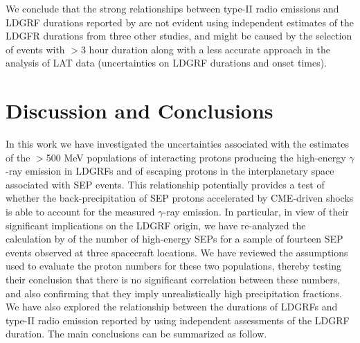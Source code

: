 \documentclass{aastex61}
\begin{document}
We conclude that 
the strong relationships between type-II radio emissions and LDGRF durations reported by \citet{ref:GOPALSWAMY2018} are not evident using independent estimates of the LDGFR durations from three other studies, and might be caused by the selection of events with $>$3 hour duration along with a less accurate approach in the analysis of LAT data (uncertainties on LDGRF durations and onset times).



%
%
%
%
\section{Discussion and Conclusions}\label{Conclusions}
In this work we have investigated the uncertainties associated with 
the estimates of
the $>$500 MeV populations of interacting protons producing the high-energy $\gamma$-ray emission in LDGRFs and of escaping protons in the interplanetary space associated with SEP events.
This relationship potentially provides a test of whether the back-precipitation of SEP protons accelerated by CME-driven shocks is able to account for the measured $\gamma$-ray emission. 
In particular, in view of their significant implications on the LDGRF origin, we have re-analyzed the calculation by \citet{ref:DENOLFO2019} of the number of high-energy SEPs for a sample of fourteen SEP events observed at three spacecraft locations. We have reviewed the assumptions used to evaluate the proton numbers for these two populations,
thereby testing their conclusion that there is no significant correlation between these numbers, and also confirming that they imply unrealistically high precipitation fractions.  We have also explored the relationship between the durations of LDGRFs and type-II radio emission reported by \citet{ref:GOPALSWAMY2018} using independent assessments of the LDGRF duration. 
The main conclusions can be summarized as follow.
\end{document}
